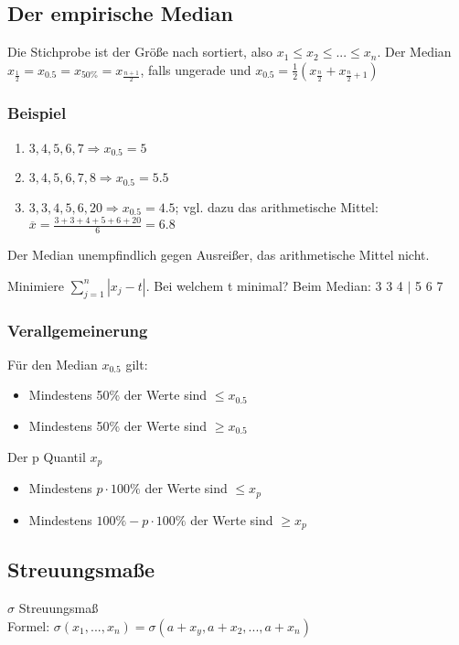 \renewcommand{\ldate}{2015-10-12}

\subsection{Der empirische Median}
Die Stichprobe ist der Größe nach sortiert, also $ x_1 \leq x_2 \leq ... \leq x_n $. Der Median $ x_{\frac{1}{2}} = x_{0.5} = x_{50 \%} = x_{ \frac{n+1}{2}} $, falls ungerade und $ x_{0.5} = \frac{1}{2} (x_{\frac{n}{2}} + x_{\frac{n}{2}+1}) $

\subsubsection{Beispiel}
\begin{enumerate}
\item $ 3,4,5,6,7 \Rightarrow x_{0.5} = 5 $
\item $ 3,4,5,6,7,8 \Rightarrow x_{0.5} = 5.5 $
\item $ 3,3,4,5,6,20 \Rightarrow x_{0.5} = 4.5 $; vgl. dazu das arithmetische Mittel: $ \overline{x} = \frac{3+3+4+5+6+20}{6} = 6.8 $
\end{enumerate}

Der Median unempfindlich gegen Ausreißer, das arithmetische Mittel nicht. 

Minimiere $ \sum_{j=1}^{n} | x_j - t | $. Bei welchem t minimal? Beim Median: 3 3 4 $ \vert $ 5 6 7 %

\subsubsection{Verallgemeinerung}
Für den Median $ x_{0.5} $ gilt: 
\begin{itemize}
\item Mindestens 50\% der Werte sind $\leq x_{0.5} $
\item Mindestens 50\% der Werte sind $\geq x_{0.5} $
\end{itemize}

Der p Quantil $ x_p $
\begin{itemize}
\item Mindestens $p \cdot 100\%$ der Werte sind $\leq x_p $
\item Mindestens $100\% - p \cdot 100\% $ der Werte sind $\geq x_p $
\end{itemize}

\subsection{Streuungsmaße}
$ \sigma $ Streuungsmaß\\
Formel: $ \sigma(x_1,...,x_n) = \sigma(a+x_y,a+x_2,...,a+x_n) $

